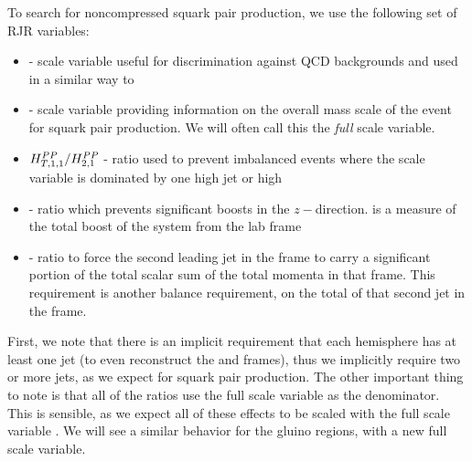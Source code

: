 To search for noncompressed squark pair production, we use the following set of RJR variables:
\begin{itemize}
\item {} - scale variable useful for discrimination against QCD backgrounds and used in a similar way to \met
\item {} - scale variable providing information on the overall mass scale of the event for squark pair production.  We will often call this the \textit{full} scale variable.
\item $H^{{PP }}_{T,1,1}/H^{{PP }}_{2,1} $ - ratio used to prevent imbalanced events where the scale variable is dominated by one high \pT jet or high \met
\item \pzlabratioTwo - ratio which prevents significant boosts in the $z-$direction.  \pzlab is a measure of the total boost of the \PP system from the lab frame
\item \ptjTworatio - ratio to force the second leading jet in the \PP frame to carry a significant portion of the total scalar sum of the total momenta in that frame.  This requirement is another balance requirement, on the total \pT of that second jet in the \PP frame.
\end{itemize}
First, we note that there is an implicit requirement that each hemisphere has at least one jet (to even reconstruct the \Pa and \Pb frames), thus we implicitly require two or more jets, as we expect for squark pair production.
The other important thing to note is that all of the ratios use the full scale variable as the denominator.
This is sensible, as we expect all of these effects to be scaled with the full scale variable .
We will see a similar behavior for the gluino regions, with a new full scale variable.

